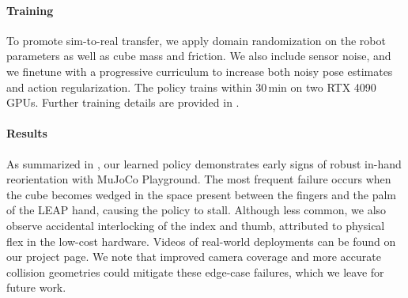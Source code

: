 \paragraph{Training} To promote sim-to-real transfer, we apply domain randomization on the robot parameters as well as cube mass and friction. We also include sensor noise, and we finetune with a progressive curriculum to increase both noisy pose estimates and action regularization. The policy trains within 30\,min on two RTX 4090 GPUs. Further training details are provided in .

\paragraph{Results} As summarized in , our learned policy demonstrates early signs of robust in-hand reorientation with MuJoCo Playground. The most frequent failure occurs when the cube becomes wedged in the space present between the fingers and the palm of the LEAP hand, causing the policy to stall. Although less common, we also observe accidental interlocking of the index and thumb, attributed to physical flex in the low-cost hardware. Videos of real-world deployments can be found on our project page. We note that improved camera coverage and more accurate collision geometries could mitigate these edge-case failures, which we leave for future work.

\begin{table}[t]
  \centering
  \caption{\small{In-hand reorientation results on the LEAP hand over 10 trials, reporting the number of consecutive successful rotations before failure. The final two columns show the median and mean of the \#Rotations metric.}}
  \label{tab:leaphandcubereorientationdetails}
  \vspace{-5pt}
  \scriptsize
  \renewcommand{\arraystretch}{1.1}
  \setlength{\tabcolsep}{5pt}
  \vspace{-10pt}
\end{table}

